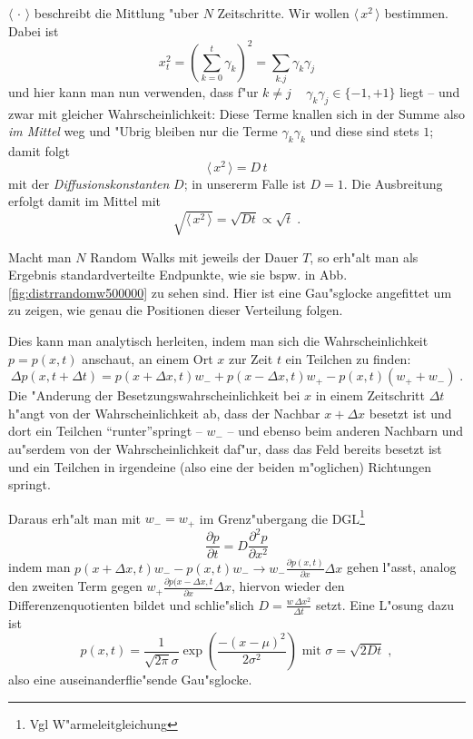 \documentclass[a4paper]{book}
\newcommand{\mittel}[1]{\ensuremath{\langle  \, #1 \,  \rangle}}
\begin{document}
$\mittel \cdot$ beschreibt die Mittlung "uber $N$ Zeitschritte. Wir
wollen $\mittel {x^2}$ bestimmen. Dabei ist
\begin{equation*}
  x_t^2 = \left( \sum_{k=0}^t  \gamma_k \right)^2 = \sum_{k.j}\gamma_k\gamma_j
\end{equation*}
und hier kann man nun verwenden, dass f"ur $k \neq j$ ~ $\gamma_k\gamma_j \in \{-1,+1\}$
liegt -- und zwar mit gleicher Wahrscheinlichkeit: Diese Terme knallen
sich in der Summe also \emph{im Mittel} weg und "Ubrig bleiben nur die Terme
$\gamma_k\gamma_k$ und diese sind stets $1$; damit folgt
\begin{equation}
  \label{eq:92}
  \mittel {x^2} = D \, t
\end{equation}
mit der \emph{Diffusionskonstanten} $D$; in unsererm Falle ist $D =
1$. Die Ausbreitung erfolgt damit im Mittel mit 
\begin{equation}
  \label{eq:93}
  \sqrt{ \mittel{ x^2 } } = \sqrt { D t } \propto \sqrt t \;.
\end{equation}

Macht man $N$ Random Walks mit jeweils der Dauer $T$, so erh"alt man
als Ergebnis standardverteilte Endpunkte, wie sie bspw. in
Abb. \ref{fig:distrrandomw500000} zu sehen sind. Hier ist eine
Gau"sglocke angefittet um zu zeigen, wie genau die Positionen dieser
Verteilung folgen.

Dies kann man analytisch herleiten, indem man sich die
Wahrscheinlichkeit $p = p(x,t)$ anschaut, an einem Ort $x$ zur Zeit
$t$ ein Teilchen zu finden:
\begin{equation*}
  \Delta p(x,t+\Delta t) = p(x+\Delta x,t) w_- + p(x-\Delta x,t) w_+ -
  p(x,t)(w_+ + w_-) \;.
\end{equation*}
Die "Anderung der Besetzungswahrscheinlichkeit bei $x$ in einem
Zeitschritt $\Delta t$ h"angt von der Wahrscheinlichkeit ab, dass der
Nachbar $x+\Delta x$ besetzt ist und dort ein Teilchen
"`runter"'springt -- $w_-$ -- und ebenso beim anderen Nachbarn und
au"serdem von der Wahrscheinlichkeit daf"ur, dass das Feld bereits
besetzt ist und ein Teilchen in irgendeine (also eine der beiden
m"oglichen) Richtungen springt. 

Daraus erh"alt man mit $w_- = w_+$ im Grenz"ubergang die DGL\footnote{Vgl W"armeleitgleichung}
\begin{equation*}
  \frac{\partial p}{\partial t} = D \frac{\partial ^2 p}{\partial x^2}
\end{equation*}
indem man $p(x+\Delta x,t) w_-  - p(x,t) w_- \to w_- \frac{\partial
  p(x,t)}{\partial x} \Delta x$ gehen l"asst, analog den zweiten Term
gegen $w_+ \frac{\partial p(x-\Delta x,t}{\partial x}\Delta x$,
hiervon wieder den Differenzenquotienten bildet und schlie"slich $D =
\frac{w \, \Delta x^2}{\Delta t}$ setzt. Eine L"osung dazu ist
\begin{equation*}
  p(x,t) = \frac{1}{\sqrt{2\pi} \sigma} \exp\left(
    \frac{-(x-\mu)^2}{2\sigma^2} \right ) \text{ mit } \sigma = \sqrt{
    2 D t } \;,
\end{equation*}
also eine auseinanderflie"sende Gau"sglocke.
\end{document}
